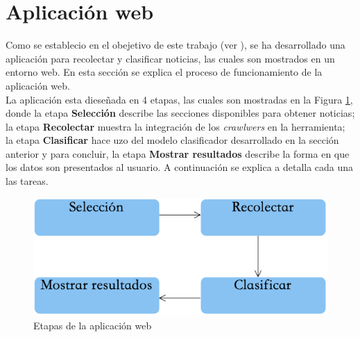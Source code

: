 \section[Aplicación]{Aplicación web}


Como se establecio en el obejetivo de este trabajo (ver ), se ha desarrollado una aplicación para recolectar y clasificar noticias, las cuales son mostrados en un entorno web. En esta sección se explica el proceso de funcionamiento de la aplicación web.\\



La aplicación esta dieseñada en 4 etapas, las cuales son mostradas en la Figura \ref{fig:procesoAppWeb}, donde la etapa \textbf{Selección} describe las secciones disponibles para obtener noticias; la etapa \textbf{Recolectar} muestra la integración de los \textit{crawlwers} en la herramienta; la etapa \textbf{Clasificar} hace uzo del modelo clasificador desarrollado en la sección anterior y para concluir, la etapa \textbf{Mostrar resultados} describe la forma en que los datos son presentados al usuario. A continuación se explica a detalla cada una las tareas.




\begin{figure}[H]
	\centering
	\includegraphics[scale=0.55]{imagenes/Capitulo5/AplicacionWeb/ProcesoAplicacionWeb.png}
	\caption{Etapas de la aplicación web}
	\label{fig:procesoAppWeb}
\end{figure}

%
%
%

